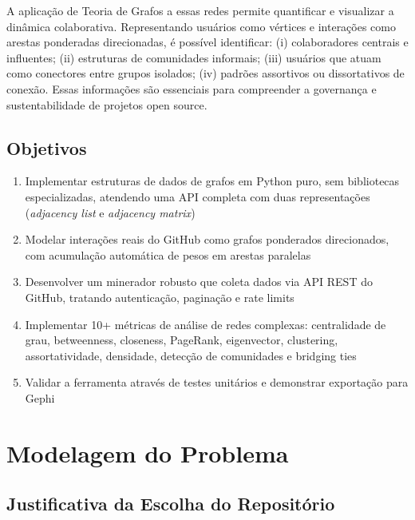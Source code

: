\documentclass[12pt]{article}
\begin{document}
A aplicação de Teoria de Grafos a essas redes permite quantificar e visualizar a dinâmica colaborativa. Representando usuários como vértices e interações como arestas ponderadas direcionadas, é possível identificar: (i) colaboradores centrais e influentes; (ii) estruturas de comunidades informais; (iii) usuários que atuam como conectores entre grupos isolados; (iv) padrões assortivos ou dissortativos de conexão. Essas informações são essenciais para compreender a governança e sustentabilidade de projetos open source.

\subsection{Objetivos}

\begin{enumerate}
  \item Implementar estruturas de dados de grafos em Python puro, sem bibliotecas especializadas, atendendo uma API completa com duas representações (\textit{adjacency list} e \textit{adjacency matrix})
  \item Modelar interações reais do GitHub como grafos ponderados direcionados, com acumulação automática de pesos em arestas paralelas
  \item Desenvolver um minerador robusto que coleta dados via API REST do GitHub, tratando autenticação, paginação e rate limits
  \item Implementar 10+ métricas de análise de redes complexas: centralidade de grau, betweenness, closeness, PageRank, eigenvector, clustering, assortatividade, densidade, detecção de comunidades e bridging ties
  \item Validar a ferramenta através de testes unitários e demonstrar exportação para Gephi
\end{enumerate}

\section{Modelagem do Problema}\label{sec:modelagem}

\subsection{Justificativa da Escolha do Repositório}
\end{document}
